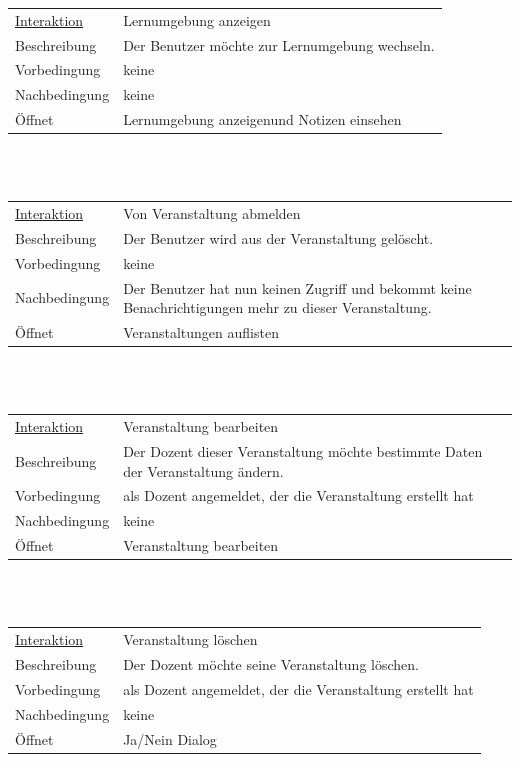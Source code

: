 \documentclass[12pt,a4paper]{article}
\begin{document}
{\begin{tabular}{l p{12cm}}
\underline{Interaktion}  	 & Lernumgebung anzeigen\\ 
Beschreibung   	 & Der Benutzer möchte zur Lernumgebung wechseln.  \\
Vorbedingung	 & keine \\
Nachbedingung	 & keine \\
Öffnet			 & \glqq Lernumgebung anzeigen\grqq und \glqq Notizen einsehen\grqq \\
\end{tabular}\\\\

\begin{tabular}{l p{12cm}}
\underline{Interaktion}  	 & Von Veranstaltung abmelden\\ 
Beschreibung   	 & Der Benutzer wird aus der Veranstaltung gelöscht.  \\
Vorbedingung	 & keine \\
Nachbedingung	 & Der Benutzer hat nun keinen Zugriff und bekommt keine Benachrichtigungen mehr zu dieser Veranstaltung. \\
Öffnet			 & \glqq Veranstaltungen auflisten\grqq \\
\end{tabular}\\\\

\begin{tabular}{l p{12cm}}
\underline{Interaktion}  	 & Veranstaltung bearbeiten\\ 
Beschreibung   	 & Der Dozent dieser Veranstaltung möchte bestimmte Daten der Veranstaltung ändern.  \\
Vorbedingung	 & als Dozent angemeldet, der die Veranstaltung erstellt hat \\
Nachbedingung	 & keine \\
Öffnet			 & \glqq Veranstaltung bearbeiten\grqq \\
\end{tabular}\\\\

\begin{tabular}{l p{12cm}}
\underline{Interaktion}  	 & Veranstaltung löschen\\ 
Beschreibung   	 & Der Dozent möchte seine Veranstaltung löschen.  \\
Vorbedingung	 & als Dozent angemeldet, der die Veranstaltung erstellt hat \\
Nachbedingung	 & keine \\
Öffnet			 & \glqq Ja/Nein Dialog\grqq \\


\end{tabular}}
\end{document}
